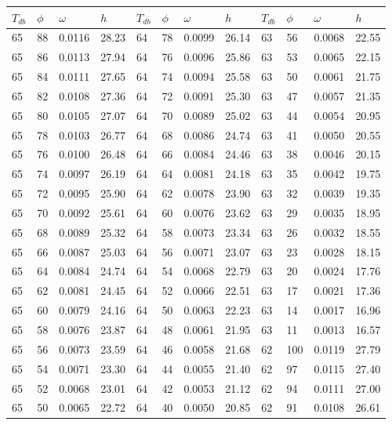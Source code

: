 \begin{tabular}{llll|llll|llll}
 \toprule 
\(T_{db}\) & \(\phi\) & \(\omega\) & \(h\) & \(T_{db}\) & \(\phi\) & \(\omega\) & \(h\) & \(T_{db}\) & \(\phi\) & \(\omega\) & \(h\)  \\ \midrule 
65 & 88 & 0.0116 & 28.23 & 64 & 78 & 0.0099 & 26.14 & 63 & 56 & 0.0068 & 22.55\\
65 & 86 & 0.0113 & 27.94 & 64 & 76 & 0.0096 & 25.86 & 63 & 53 & 0.0065 & 22.15\\
65 & 84 & 0.0111 & 27.65 & 64 & 74 & 0.0094 & 25.58 & 63 & 50 & 0.0061 & 21.75\\
65 & 82 & 0.0108 & 27.36 & 64 & 72 & 0.0091 & 25.30 & 63 & 47 & 0.0057 & 21.35\\
65 & 80 & 0.0105 & 27.07 & 64 & 70 & 0.0089 & 25.02 & 63 & 44 & 0.0054 & 20.95\\
65 & 78 & 0.0103 & 26.77 & 64 & 68 & 0.0086 & 24.74 & 63 & 41 & 0.0050 & 20.55\\
65 & 76 & 0.0100 & 26.48 & 64 & 66 & 0.0084 & 24.46 & 63 & 38 & 0.0046 & 20.15\\
65 & 74 & 0.0097 & 26.19 & 64 & 64 & 0.0081 & 24.18 & 63 & 35 & 0.0042 & 19.75\\
65 & 72 & 0.0095 & 25.90 & 64 & 62 & 0.0078 & 23.90 & 63 & 32 & 0.0039 & 19.35\\
65 & 70 & 0.0092 & 25.61 & 64 & 60 & 0.0076 & 23.62 & 63 & 29 & 0.0035 & 18.95\\
65 & 68 & 0.0089 & 25.32 & 64 & 58 & 0.0073 & 23.34 & 63 & 26 & 0.0032 & 18.55\\
65 & 66 & 0.0087 & 25.03 & 64 & 56 & 0.0071 & 23.07 & 63 & 23 & 0.0028 & 18.15\\
65 & 64 & 0.0084 & 24.74 & 64 & 54 & 0.0068 & 22.79 & 63 & 20 & 0.0024 & 17.76\\
65 & 62 & 0.0081 & 24.45 & 64 & 52 & 0.0066 & 22.51 & 63 & 17 & 0.0021 & 17.36\\
65 & 60 & 0.0079 & 24.16 & 64 & 50 & 0.0063 & 22.23 & 63 & 14 & 0.0017 & 16.96\\
65 & 58 & 0.0076 & 23.87 & 64 & 48 & 0.0061 & 21.95 & 63 & 11 & 0.0013 & 16.57\\
65 & 56 & 0.0073 & 23.59 & 64 & 46 & 0.0058 & 21.68 & 62 & 100 & 0.0119 & 27.79\\
65 & 54 & 0.0071 & 23.30 & 64 & 44 & 0.0055 & 21.40 & 62 & 97 & 0.0115 & 27.40\\
65 & 52 & 0.0068 & 23.01 & 64 & 42 & 0.0053 & 21.12 & 62 & 94 & 0.0111 & 27.00\\
65 & 50 & 0.0065 & 22.72 & 64 & 40 & 0.0050 & 20.85 & 62 & 91 & 0.0108 & 26.61\\

\end{tabular}
